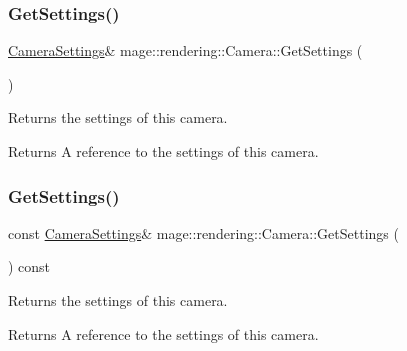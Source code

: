 \mbox{\label{classmage_1_1rendering_1_1_camera_a32588a00052469be808d2819953ea2a4}} 
\subsubsection{\texorpdfstring{Get\+Settings()}{GetSettings()}\hspace{0.1cm}{\footnotesize\ttfamily [1/2]}}
{\footnotesize\ttfamily \mbox{\hyperlink{classmage_1_1rendering_1_1_camera_settings}{Camera\+Settings}}\& mage\+::rendering\+::\+Camera\+::\+Get\+Settings (\begin{DoxyParamCaption}{ }\end{DoxyParamCaption})\hspace{0.3cm}{\ttfamily [noexcept]}}

Returns the settings of this camera.

\begin{DoxyReturn}{Returns}
A reference to the settings of this camera. 
\end{DoxyReturn}
\mbox{\label{classmage_1_1rendering_1_1_camera_a65d79baabdaaf9847102a03f6965e0ed}} 
\subsubsection{\texorpdfstring{Get\+Settings()}{GetSettings()}\hspace{0.1cm}{\footnotesize\ttfamily [2/2]}}
{\footnotesize\ttfamily const \mbox{\hyperlink{classmage_1_1rendering_1_1_camera_settings}{Camera\+Settings}}\& mage\+::rendering\+::\+Camera\+::\+Get\+Settings (\begin{DoxyParamCaption}{ }\end{DoxyParamCaption}) const\hspace{0.3cm}{\ttfamily [noexcept]}}

Returns the settings of this camera.

\begin{DoxyReturn}{Returns}
A reference to the settings of this camera. 
\end{DoxyReturn}
\mbox{\label{classmage_1_1rendering_1_1_camera_aff1dea377f7f36b1d518369b3f8108cc}} 
